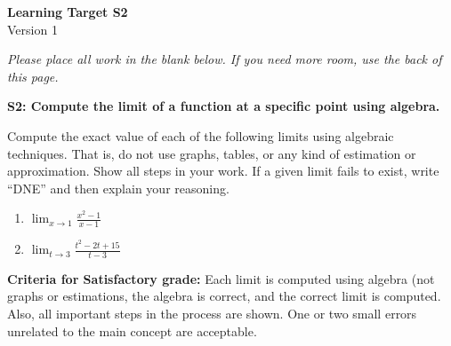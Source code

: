 \documentclass[10pt]{article}
\begin{document}
	\vspace*{0in}

		\begin{center}
			\textbf{Learning Target S2} \\
			{Version 1} \\
		\end{center}

\emph{Please place all work in the blank below. If you need more room, use the back of this page.}

\begin{framed}
	\textbf{S2: Compute the limit of a function at a specific point using algebra.}
\end{framed}

Compute the exact value of each of the following limits using algebraic techniques. That is, do not use graphs, tables, or any kind of estimation or approximation. Show all steps in your work. If a given limit fails to exist, write ``DNE'' and then explain your reasoning. 

\begin{enumerate}
    \item $\displaystyle{\lim_{x \to 1} \frac{x^2-1}{x-1}}$
    \item $\displaystyle{\lim_{t \to 3} \frac{t^2 - 2t + 15}{t-3}}$
\end{enumerate}

\vfill


\begin{small}
    \begin{framed}
        	\textbf{Criteria for Satisfactory grade:} Each limit is computed using algebra (not graphs or estimations, the algebra is correct, and the correct limit is computed. Also, all important steps in the process are shown. One or two small errors unrelated to the main concept are acceptable.
    \end{framed}

\end{small}
\end{document}
